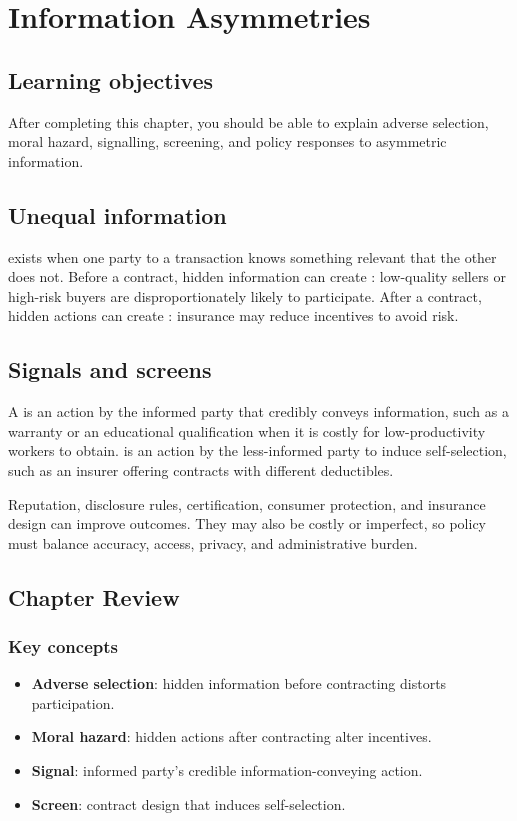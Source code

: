 \chapter{Information Asymmetries}
\label{chap:information}

\section{Learning objectives}

After completing this chapter, you should be able to explain adverse selection, moral hazard, signalling, screening, and policy responses to asymmetric information.

\section{Unequal information}

 exists when one party to a transaction knows something relevant that the other does not. Before a contract, hidden information can create : low-quality sellers or high-risk buyers are disproportionately likely to participate. After a contract, hidden actions can create : insurance may reduce incentives to avoid risk.

\section{Signals and screens}

A  is an action by the informed party that credibly conveys information, such as a warranty or an educational qualification when it is costly for low-productivity workers to obtain.  is an action by the less-informed party to induce self-selection, such as an insurer offering contracts with different deductibles.

Reputation, disclosure rules, certification, consumer protection, and insurance design can improve outcomes. They may also be costly or imperfect, so policy must balance accuracy, access, privacy, and administrative burden.

\section*{Chapter Review}

\subsection*{Key concepts}
\begin{itemize}
  \item \textbf{Adverse selection}: hidden information before contracting distorts participation.
  \item \textbf{Moral hazard}: hidden actions after contracting alter incentives.
  \item \textbf{Signal}: informed party's credible information-conveying action.
  \item \textbf{Screen}: contract design that induces self-selection.
\end{itemize}

